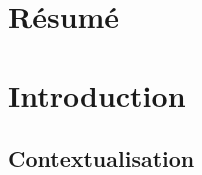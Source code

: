 \vspace*{4cm}
\section*{Résumé}


\newpage



\section{Introduction}

\subsection{Contextualisation}

